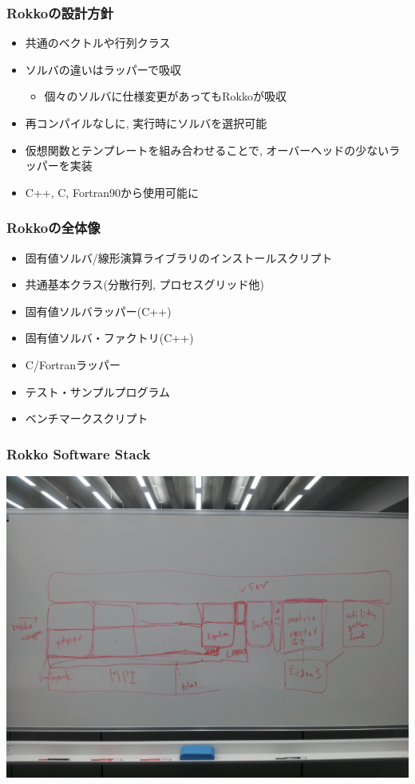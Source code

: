 \begin{frame}
  \frametitle{Rokkoの設計方針}
  \begin{itemize}
    \setlength{\itemsep}{1em}
  \item 共通のベクトルや行列クラス
  \item ソルバの違いはラッパーで吸収
    \begin{itemize}
    \item 個々のソルバに仕様変更があってもRokkoが吸収
    \end{itemize}
  \item 再コンパイルなしに, 実行時にソルバを選択可能
  \item 仮想関数とテンプレートを組み合わせることで, オーバーヘッドの少ないラッパーを実装
  \item C++, C, Fortran90から使用可能に
  \end{itemize}
\end{frame}

\begin{frame}
  \frametitle{Rokkoの全体像}
  \begin{itemize}
  \item 固有値ソルバ/線形演算ライブラリのインストールスクリプト
  \item 共通基本クラス(分散行列, プロセスグリッド他)
  \item 固有値ソルバラッパー(C++)
  \item 固有値ソルバ・ファクトリ(C++)
  \item C/Fortranラッパー
  \item テスト・サンプルプログラム
  \item ベンチマークスクリプト
  \end{itemize}
\end{frame}

\begin{frame}
  \frametitle{Rokko Software Stack}
  \begin{center}
    \includegraphics[height=0.8\textheight]{figure/rokko-software-stack.jpg}
  \end{center}
\end{frame}

